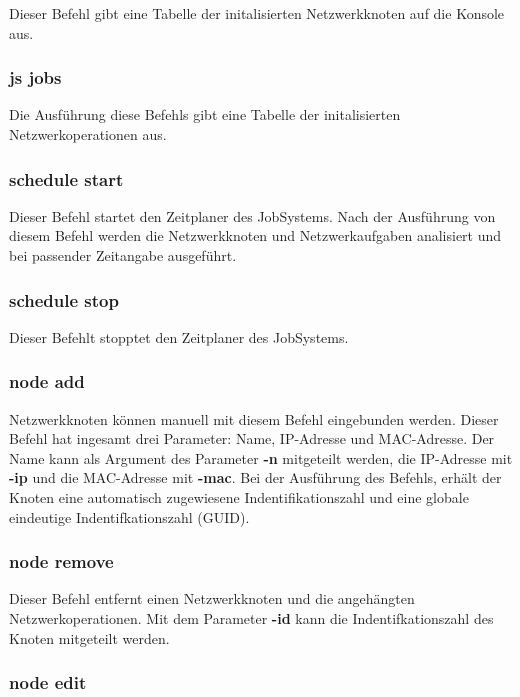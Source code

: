 \documentclass[11pt,a4paper]{report}
\begin{document}
Dieser Befehl gibt eine Tabelle der initalisierten Netzwerkknoten auf die Konsole aus.

\subsubsection{js jobs}

Die Ausführung diese Befehls gibt eine Tabelle der initalisierten Netzwerkoperationen aus.

\subsubsection{schedule start}

Dieser Befehl startet den Zeitplaner des JobSystems. Nach der Ausführung von diesem Befehl werden die Netzwerkknoten und Netzwerkaufgaben analisiert und bei passender Zeitangabe ausgeführt.

\subsubsection{schedule stop}

Dieser Befehlt stopptet den Zeitplaner des JobSystems.

\subsubsection{node add}

Netzwerkknoten können manuell mit diesem Befehl eingebunden werden. Dieser Befehl hat ingesamt drei Parameter: Name, IP-Adresse und MAC-Adresse. Der Name kann als Argument des Parameter \textbf{-n} mitgeteilt werden, die IP-Adresse mit \textbf{-ip} und die MAC-Adresse mit \textbf{-mac}. Bei der Ausführung des Befehls, erhält der Knoten eine automatisch zugewiesene Indentifikationszahl und eine globale eindeutige Indentifkationszahl (GUID).

\subsubsection{node remove}

Dieser Befehl entfernt einen Netzwerkknoten und die angehängten Netzwerkoperationen. Mit dem Parameter \textbf{-id} kann die Indentifkationszahl des Knoten mitgeteilt werden.

\subsubsection{node edit}
\end{document}
